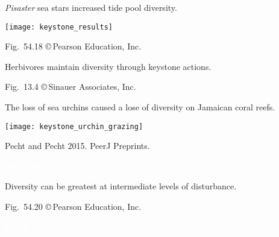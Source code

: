 \documentclass[t]{beamer}
\begin{document}
%
\begin{frame}[t]{\textit{Pisaster} sea stars increased tide pool diversity.}

	\texttt{[image: keystone\_results]}
	
	\vfilll
	
	\hfill \tiny Fig.~54.18 \copyright\,Pearson Education, Inc.
\end{frame}
%
{
\begin{frame}[b]{Herbivores maintain diversity through keystone actions.}

	\hfill \tiny Fig.~13.4 \copyright\,Sinauer Associates, Inc.
\end{frame}
}
%
\begin{frame}[t]{The loss of sea urchins caused a lose of diversity on Jamaican coral reefs.}

	{\centering \texttt{[image: keystone\_urchin\_grazing]} \par
	}
	
	\vfilll
	
	\hfill \tiny Pecht and Pecht 2015. PeerJ Preprints.
\end{frame}

%
{
\begin{frame}[b]

\hfill \tiny \textcolor{white}{\textsc{noaa}, public domain.}
\end{frame}
}
%
{
\begin{frame}[b]{Diversity can be greatest at intermediate levels of disturbance.}

	\hfill \tiny Fig.~54.20 \copyright\,Pearson Education, Inc.
\end{frame}
}
%

{
\begin{frame}[b]

\hfill \tiny \textcolor{white}{Google Earth}
\end{frame}
}
%
\end{document}
